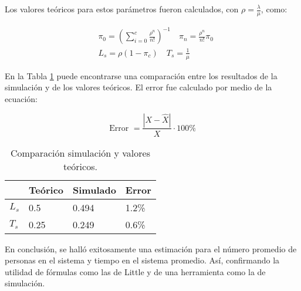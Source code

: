 \documentclass[11pt]{article}
\theoremstyle{definition}
\theoremstyle{remark}
\theoremstyle{remark}
\begin{document}
Los valores teóricos para estos parámetros fueron calculados, con
$\rho = \frac{\lambda}{\mu}$, como:

\begin{equation}
  \begin{split}
    &\pi_0 = \left(\sum_{i=0}^c \frac{\rho^n}{n!}\right)^{-1} \quad \pi_n = \frac{\rho^n}{n!} \pi_0 \\
    &L_s = \rho(1 - \pi_c) \quad T_s = \frac{1}{\mu}
  \end{split}
\end{equation}

En la Tabla \ref{tab:1} puede encontrarse una comparación entre los
resultados de la simulación y de los valores teóricos. El error fue
calculado por medio de la ecuación:

\begin{equation}
  \text{Error } = \frac{|X - \hat{X}|}{X} \cdot 100\%
\end{equation}

\begin{table}[h]
\centering
\begin{tabular}{llll}
      & Teórico & Simulado & Error \\ \hline
$L_s$ & 0.5     & 0.494    & 1.2\% \\
$T_s$ & 0.25    & 0.249    & 0.6\% \\ \hline
\end{tabular}
\caption{Comparación simulación y valores teóricos.}
\label{tab:1}
\end{table}

En conclusión, se halló exitosamente una estimación para el número
promedio de personas en el sistema y tiempo en el sistema
promedio. Así, confirmando la utilidad de fórmulas como las de Little
y de una herramienta como la de simulación.
\end{document}
